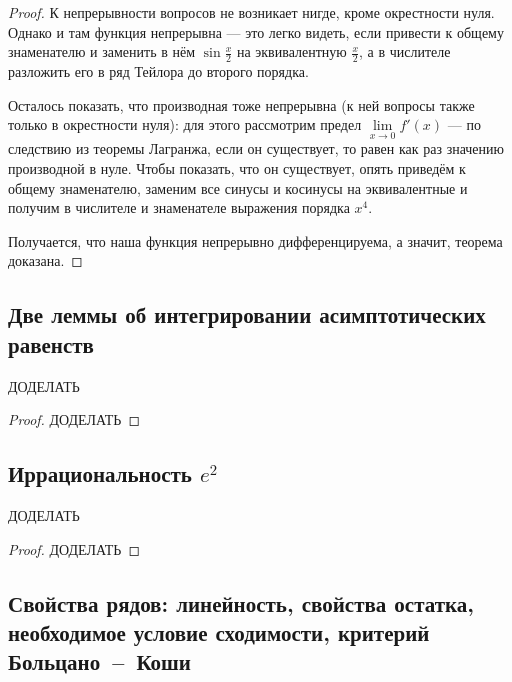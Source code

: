 \begin{proof}
	К непрерывности вопросов не возникает нигде, кроме окрестности нуля. Однако и там функция непрерывна --- это легко видеть, если привести к общему знаменателю и заменить в нём \(\sin \frac{x}{2}\) на эквивалентную \(\frac{x}{2}\), а в числителе разложить его в ряд Тейлора до второго порядка.
	
	Осталось показать, что производная тоже непрерывна (к ней вопросы также только в окрестности нуля): для этого рассмотрим предел \(\lim\limits_{x \to 0} f'(x)\) --- по следствию из теоремы Лагранжа, если он существует, то равен как раз значению производной в нуле. Чтобы показать, что он существует, опять приведём к общему знаменателю, заменим все синусы и косинусы на эквивалентные и получим в числителе и знаменателе выражения порядка \(x^4\).
	
	Получается, что наша функция непрерывно дифференцируема, а значит, теорема доказана.
\end{proof}

\subsection{Две леммы об интегрировании асимптотических равенств}

\begin{theorem}
	ДОДЕЛАТЬ
\end{theorem}
\begin{proof}
	ДОДЕЛАТЬ
\end{proof}

\subsection{Иррациональность \(e^2\)}

\begin{theorem}
	ДОДЕЛАТЬ
\end{theorem}
\begin{proof}
	ДОДЕЛАТЬ
\end{proof}

\subsection{Свойства рядов: линейность, свойства остатка, необходимое условие сходимости, критерий Больцано~--~Коши}

